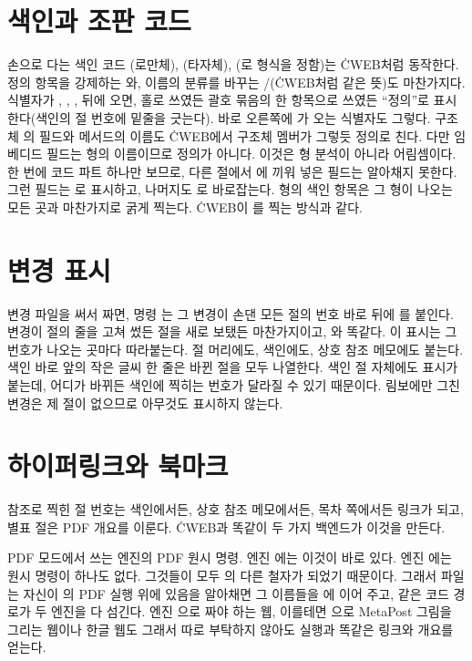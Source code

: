\section{색인과 조판 코드}
손으로 다는 색인 코드 (로만체), (타자체),
(로 형식을 정함)는 \.{CWEB}처럼 동작한다. 정의 항목을
강제하는 와, 이름의 분류를 바꾸는 /(\.{CWEB}처럼 같은 뜻)도
마찬가지다. 식별자가 , , ,  뒤에 오면, 홀로
쓰였든 괄호 묶음의 한 항목으로 쓰였든 ``정의''로 표시한다(색인의 절 번호에
밑줄을 긋는다). 바로 오른쪽에 \cw{:=}가 오는 식별자도 그렇다. 구조체 의
필드와 메서드의 이름도 \.{CWEB}에서 구조체 멤버가 그렇듯 정의로 친다. 다만
임베디드 필드는 형의 이름이므로 정의가 아니다. 이것은 형 분석이 아니라
어림셈이다. 한 번에 코드 파트 하나만 보므로, 다른 절에서 에
끼워 넣은 필드는 알아채지 못한다. 그런 필드는 로 표시하고, 나머지도
로 바로잡는다. 형의 색인 항목은 그 형이 나오는 모든 곳과 마찬가지로
굵게 찍는다. \.{CWEB}이 를 찍는 방식과 같다.

\section{변경 표시} 변경 파일을 써서 짜면, 명령 는 그 변경이 손댄
모든 절의 번호 바로 뒤에 \cw{*}를 붙인다. 변경이 절의 줄을 고쳐 썼든 절을 새로
보탰든 마찬가지이고, 와 똑같다. 이 표시는 그 번호가 나오는 곳마다
따라붙는다. 절 머리에도, 색인에도, 상호 참조 메모에도 붙는다. 색인 바로 앞의
작은 글씨 한 줄은 바뀐 절을 모두 나열한다. 색인 절 자체에도 표시가 붙는데,
어디가 바뀌든 색인에 찍히는 번호가 달라질 수 있기 때문이다. 림보에만 그친
변경은 제 절이 없으므로 아무것도 표시하지 않는다.

\section{하이퍼링크와 북마크}
참조로 찍힌 절 번호는 색인에서든, 상호 참조 메모에서든, 목차 쪽에서든 링크가
되고, 별표 절은 PDF 개요를 이룬다. \.{CWEB}과 똑같이 두 가지 백엔드가 이것을
만든다.

\bull PDF 모드에서 쓰는 엔진의 PDF 원시 명령. 엔진 에는 이것이 바로 있다.
엔진 에는  원시 명령이 하나도 없다. 그것들이 모두
의 다른 철자가 되었기 때문이다. 그래서 파일 는
자신이 의 PDF 실행 위에 있음을 알아채면 그 이름들을
에 이어 주고, 같은 코드 경로가 두 엔진을 다 섬긴다.
엔진 으로 짜야 하는 웹, 이를테면 으로 MetaPost 그림을 그리는
웹이나 한글 웹도 그래서 따로 부탁하지 않아도  실행과 똑같은 링크와
개요를 얻는다.

